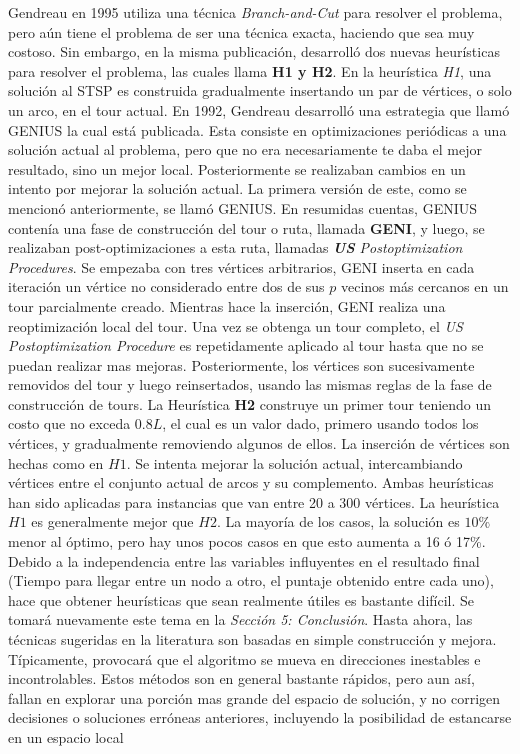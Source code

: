 \documentclass[letter, 10pt]{article}
\begin{document}
Gendreau en 1995 \cite{GendreauBrandCutH1H2} utiliza una técnica \textit{Branch-and-Cut} para resolver el problema, pero aún tiene el problema de ser una técnica exacta, haciendo que sea muy costoso. Sin embargo, en la misma publicación, desarrolló dos nuevas heurísticas para resolver el problema, las cuales llama \textbf{H1 y H2}. En la heurística \textit{H1}, una solución al STSP es construida gradualmente insertando un par de vértices, o solo un arco, en el tour actual. En 1992, Gendreau desarrolló una estrategia que llamó GENIUS \cite{problemaGenius} la cual está publicada. Esta consiste en optimizaciones periódicas a una solución actual al problema, pero que no era necesariamente te daba el mejor resultado, sino un mejor local. Posteriormente se realizaban cambios en un intento por mejorar la solución actual. La primera versión de este, como se mencionó anteriormente, se llamó GENIUS. En resumidas cuentas, GENIUS contenía una fase de construcción del tour o ruta, llamada \textbf{GENI}, y luego, se realizaban post-optimizaciones a esta ruta, llamadas \textit{\textbf{US} Postoptimization Procedures}. Se empezaba con tres vértices arbitrarios, GENI inserta en cada iteración un vértice no considerado entre dos de sus $p$ vecinos más cercanos en un tour parcialmente creado. Mientras hace la inserción, GENI realiza una reoptimización local del tour. Una vez se obtenga un tour completo, el \textit{US Postoptimization Procedure} es repetidamente aplicado al tour hasta que no se puedan realizar mas mejoras. Posteriormente, los vértices son sucesivamente removidos del tour y luego reinsertados, usando las mismas reglas de la fase de construcción de tours.  La Heurística \textbf{H2} construye un primer tour teniendo un costo que no exceda $0.8L$, el cual es un valor dado, primero usando todos los vértices, y gradualmente removiendo algunos de ellos. La inserción de vértices son hechas como en $H1$. Se intenta mejorar la solución actual, intercambiando vértices entre el conjunto actual de arcos y su complemento. Ambas heurísticas han sido aplicadas para instancias que van entre 20 a 300 vértices. La heurística $H1$ es generalmente mejor que $H2$. La mayoría de los casos, la solución es $10\%$ menor al óptimo, pero hay unos pocos casos en que esto aumenta a 16 ó 17\%.
\newline
Debido a la independencia entre las variables influyentes en el resultado final (Tiempo para llegar entre un nodo a otro, el puntaje obtenido entre cada uno), hace que obtener heurísticas que sean realmente útiles es bastante difícil. Se tomará nuevamente este tema en la \textit{Sección 5: Conclusión}. Hasta ahora, las técnicas sugeridas en la literatura son basadas en simple construcción y mejora. Típicamente, provocará que el algoritmo se mueva en direcciones inestables e incontrolables. Estos métodos son en general bastante rápidos, pero aun así, fallan en explorar una porción mas grande del espacio de solución, y no corrigen decisiones o soluciones erróneas anteriores, incluyendo la posibilidad de estancarse en un espacio local
\end{document}
